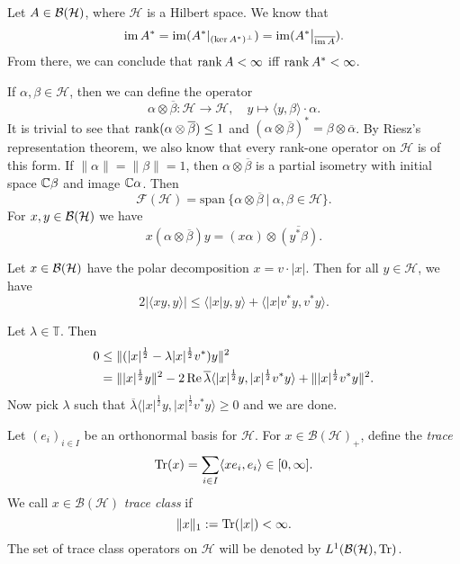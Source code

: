 \begin{remark}
  Let $A \in \operatorname{\mathcal{B} (\mathcal{H})}$, where $\mathcal{H}$ is a Hilbert space.
  We know that 
$$\operatorname{im} A^* = \operatorname{im} (A^* |_{(\ker A^*)^\perp}) = \operatorname{im} (A^* \big|_{\overline{\operatorname{im} A}}).$$
From there, we can conclude that $\operatorname{rank} A < \infty$ iff $\operatorname{rank} A^* < \infty$.
\end{remark}

If $\alpha, \beta \in \mathcal{H}$, then we can define the operator
$$\alpha \otimes \overline{\beta} : \mathcal{H} \to \mathcal{H},\quad y \mapsto \langle y, \beta \rangle \cdot \alpha.$$
It is trivial to see that $\operatorname{rank} (\alpha \otimes \overline{\beta}) \leq 1$ and $(\alpha \otimes \overline{\beta})^* = \beta \otimes \overline{\alpha}$.
By Riesz's representation theorem, we also know that every rank-one operator on $\mathcal{H}$
is of this form.
If $\| \alpha\| = \| \beta \| = 1$, then $\alpha \otimes \overline{\beta}$
is a partial isometry with initial space $\mathbb {C} \beta$ and image $\mathbb {C} \alpha$.
Then $$\mathcal{F} (\mathcal{H}) = \mathrm{span}\ \{\alpha \otimes \overline{\beta}\ |\ \alpha, \beta \in \mathcal{H}\}.$$
For $x, y \in \operatorname{\mathcal{B} (\mathcal{H})}$ we have $$x (\alpha \otimes \overline{\beta}) y = (x \alpha) \otimes \overline{(y^* \beta)}.$$  
\begin{lemma}\label{lem:4.1}
  Let $x \in \operatorname{\mathcal{B} (\mathcal{H})}$ have the polar decomposition $x = v \cdot |x|$.
  Then for all $y \in \mathcal{H}$, we have 
  $$2 \left| \langle xy , y \rangle \right| \leq \langle |x| y, y\rangle + \langle |x|v^* y, v^* y \rangle.$$
\end{lemma}

\begin{myproof}
  Let $\lambda \in \mathbb{T}$. Then 
  \begin{align*}
    0 &\leq \|(|x|^{\frac{1}{2}} - \lambda |x|^{\frac{1}{2}} v^*) y\|^2\\
    &= \| |x|^{\frac{1}{2}} y\|^2 - 2 \operatorname{Re} \overline{\lambda} \langle |x|^{\frac{1}{2}} y, |x|^{\frac{1}{2}} v^* y\rangle + \||x|^{\frac{1}{2}} v^* y\|^2.
  \end{align*}
  Now pick $\lambda$ such that $\overline{\lambda} \langle |x|^{\frac{1}{2}} y, |x|^{\frac{1}{2}} v^* y \rangle \geq 0$ and we are done.
\end{myproof}

\begin{definition}
  Let $(e_i)_{i \in I}$ be an orthonormal basis for $\mathcal{H}$. For $x \in \mathcal{B}(\mathcal{H})_+$,
  define the \emph{trace} 
  $$\operatorname{Tr} (x) = \sum_{i \in I} \langle x e_i, e_i \rangle \in [0, \infty].$$
  We call $x \in \mathcal{B}(\mathcal{H})$ \emph{trace class} if 
  $$\| x\|_1 := \operatorname{Tr} (|x|) < \infty.$$
  The set of trace class operators on $\mathcal{H}$ will be denoted by $L^1 (\operatorname{\mathcal{B} (\mathcal{H})}, \operatorname{Tr})$.
\end{definition}

